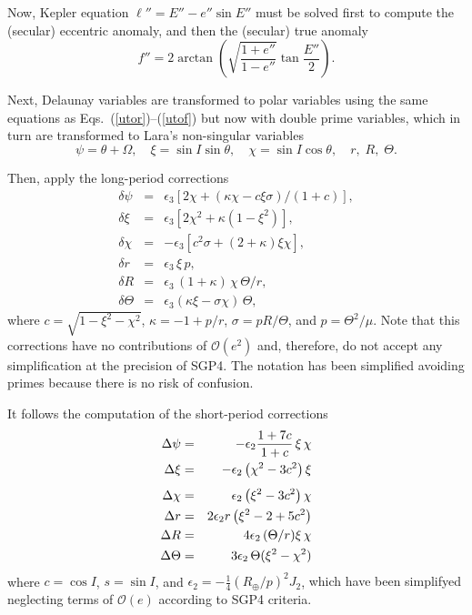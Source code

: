 \documentclass{article}
\begin{document}
Now, Kepler equation $\ell''=E''-e''\sin{E}''$ must be solved first to compute the (secular) eccentric anomaly, and then the (secular) true anomaly
\[
f''=2\arctan\left(\sqrt{\frac{1+e''}{1-e''}}\tan\frac{E''}{2}\right).
\]
\par

Next, Delaunay variables are transformed to polar variables using the same equations as Eqs.~(\ref{utor})--(\ref{utof}) but now with double prime variables, which in turn are transformed to Lara's non-singular variables
\[
\psi=\theta+\Omega,\quad \xi=\sin{I}\sin\theta,\quad \chi=\sin{I}\cos\theta,\quad r,\; R,\; \Theta.
\]

{\color{red}
Then, apply the long-period corrections
\begin{eqnarray*} \label{dyns}
\delta\psi &=& \epsilon_3\left[2 \chi+(\kappa  \chi -c \xi  \sigma)/(1+c)\right],
\\  \label{dxins}
\delta\xi &=& 
\epsilon_3\left[2 \chi ^2+\kappa  \left(1-\xi ^2\right) \right],
\\ \label{dchins}
\delta\chi &=& %
-\epsilon_3\left[c^2 \sigma +(2+\kappa) \xi  \chi \right],
\\ \label{drns}
\delta{r} &=& \epsilon_3\,\xi\,p,
\\ \label{dRRns}
\delta{R} &=& %
\epsilon_3\,(1+\kappa)\,\chi\,\Theta/r,
\\ \label{dZZns}
\delta\Theta &=&\epsilon_3(\kappa\xi-\sigma\chi)\,\Theta,
\end{eqnarray*}
where $c=\sqrt{1-\xi^2-\chi^2}$, $\kappa=-1+p/r$, $\sigma=pR/\Theta$, and $p=\Theta^2/\mu$. Note that this corrections have no contributions of $\mathcal{O}(e^2)$ and, therefore, do not accept any simplification at the precision of SGP4. The notation has been simplified avoiding primes because there is no risk of confusion.
\par
}

It follows the computation of the short-period corrections
\begin{eqnarray*}
\Delta\psi &=& -\epsilon_2\frac{1+7c}{1+c}\,\xi\,\chi
\\
\Delta\xi &=& -\epsilon_2\left(\chi^2-3c^2\right)\xi
\\[1ex]
\Delta\chi &=& \epsilon_2\left(\xi^2-3c^2\right)\chi
\\
\Delta{r} &=& %
\color{red}2\epsilon_2r\left(\xi^2-2+5c^2\right)
\\
\Delta{R} &=& %
4\epsilon_2\,(\Theta/r)\xi\,\chi
\\
\Delta\Theta &=&  3\epsilon_2\,\Theta(\xi^2-\chi^2)
\end{eqnarray*}
where $c=\cos{I}$, $s=\sin{I}$, and $\epsilon_2=-\frac{1}{4}(R_\oplus/p)^2J_2$, {\color{red}which have been simplifyed neglecting terms of $\mathcal{O}(e)$ according to SGP4 criteria}.
\par
\end{document}
